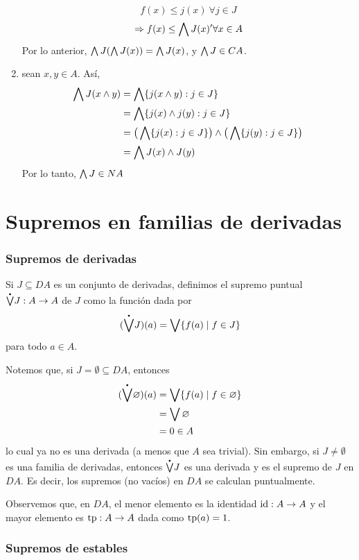 \begin{sol}
\begin{enumerate}
        $$f(x)\leq j(x) \ \forall j\in J$$
        $$\Rightarrow f(x)\leq \bigwedge J(x) ' \forall x\in A$$
        Por lo anterior, $\bigwedge J(\bigwedge J(x))=\bigwedge J(x)$, y $\bigwedge J \in CA$.
        \item sean $x,y\in A$. Así, 
        \begin{align*}
            \bigwedge J(x\wedge y)&=\bigwedge\{j(x\wedge y):j\in J\}\\
            &=\bigwedge\{j(x)\wedge j(y):j\in J\}\\
            &=\big(\bigwedge\{j(x):j\in J\}\big)
            \wedge\big( \bigwedge\{j(y):j\in J\}\big)\\
            &=\bigwedge J(x)\wedge J(y)
        \end{align*}
        Por lo tanto, $\bigwedge J \in NA$
    \end{enumerate}
\end{sol}

\section{Supremos en familias de derivadas}

\subsubsection{Supremos de derivadas }

\begin{defn}
  Si $J\subseteq DA$ es un conjunto de derivadas,
  definimos el supremo puntual $\pSup J:A\to A$ de $J$ como la
  función dada por
  \[
    (\pSup J)(a) = \Sup\{f(a) \mid f\in J\}
  \]
  para todo $a\in A$.
\end{defn}
Notemos que, si $J=\emptyset\subseteq DA$, entonces
\begin{align*}
  (\pSup\emptyset)(a)
  &= \Sup\{f(a) \mid f\in\emptyset\} \\
  &= \Sup\emptyset \\
  &= 0 \in A
\end{align*}
lo cual ya no es una derivada (a menos que $A$ sea trivial).
Sin embargo, si $J\neq\emptyset$ es una familia de derivadas,
entonces $\pSup J$ es una derivada y es el supremo de $J$ en
$DA$.
Es decir, los supremos (no vacíos) en $DA$ se calculan
puntualmente.

Observemos que, en $DA$, el menor elemento es la identidad
$\mathrm{id}:A\to A$ y el mayor elemento es $\mathrm{tp}:A\to A$ dada como
$\mathrm{tp}(a)=1$.

\subsubsection{Supremos de estables }

